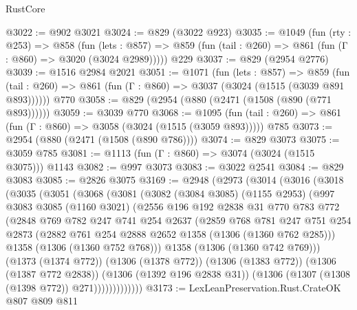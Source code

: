 \begin{lexlean}{RustCore}
\begin{coremodule}
@3022 := @902 @3021
@3024 := @829 (@3022 @923)
@3035 := @1049
    (fun (rty : @253) =>
    @858
      (fun (lets : @857) =>
      @859 (fun (tail : @260) => @861 (fun (Γ : @860) => @3020 (@3024 @2989)))))
    @229
@3037 := @829 (@2954 @2776)
@3039 := @1516 @2984 @2021
@3051 := @1071
    (fun (lets : @857) =>
    @859 (fun (tail : @260) => @861 (fun (Γ : @860) => @3037 (@3024 (@1515 (@3039 @891 @893))))))
    @770
@3058 := @829 (@2954 (@880 (@2471 (@1508 (@890 (@771 @893))))))
@3059 := @3039 @770
@3068 := @1095
    (fun (tail : @260) => @861 (fun (Γ : @860) => @3058 (@3024 (@1515 (@3059 @893)))))
    @785
@3073 := @2954 (@880 (@2471 (@1508 (@890 @786))))
@3074 := @829 @3073
@3075 := @3059 @785
@3081 := @1113 (fun (Γ : @860) => @3074 (@3024 (@1515 @3075))) @1143
@3082 := @997 @3073
@3083 := @3022 @2541
@3084 := @829 @3083
@3085 := @2826 @3075
@3169 := @2948
    (@2973
      (@3014
        (@3016
          (@3018
            (@3035
              (@3051
                (@3068
                  (@3081
                    (@3082
                      (@3084 @3085)
                      (@1155 @2953)
                      (@997
                        @3083
                        @3085
                        (@1160 @3021)
                        (@2556
                          @196
                          @192
                          @2838
                          @31
                          @770
                          @783
                          @772
                          (@2848
                            @769
                            @782
                            @247
                            @741
                            @254
                            @2637
                            (@2859
                              @768
                              @781
                              @247
                              @751
                              @254
                              @2873
                              (@2882 @761 @254 @2888 @2652 @1358 (@1306 (@1360 @762 @285)))
                              @1358
                              (@1306 (@1360 @752 @768)))
                            @1358
                            (@1306 (@1360 @742 @769)))
                          (@1373 (@1374 @772))
                          (@1306 (@1378 @772))
                          (@1306 (@1383 @772))
                          (@1306 (@1387 @772 @2838))
                          (@1306 (@1392 @196 @2838 @31))
                          (@1306 (@1307 (@1308 (@1398 @772)) @271)))))))))))))
@3173 := LexLeanPreservation.Rust.CrateOK @807 @809 @811

\end{coremodule}
\end{lexlean}
